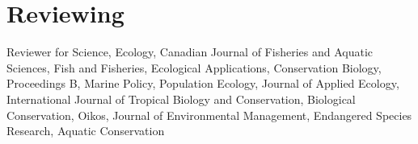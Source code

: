 \hypertarget{reviewing}{%
\section{Reviewing}\label{reviewing}}

Reviewer for Science, Ecology, Canadian Journal of Fisheries and Aquatic
Sciences, Fish and Fisheries, Ecological Applications, Conservation
Biology, Proceedings B, Marine Policy, Population Ecology, Journal of
Applied Ecology, International Journal of Tropical Biology and
Conservation, Biological Conservation, Oikos, Journal of Environmental
Management, Endangered Species Research, Aquatic Conservation

